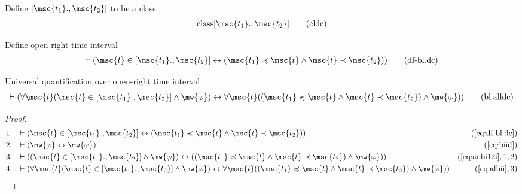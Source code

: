 \begin{metadefinition} Define $[ \msc{t_1}  .,  \msc{t_2} ]$ to be
a class
\begin{align}
{\rm class} [ \msc{t_1} ., \msc{t_2} ]\label{eq:cldc}\tag{cldc}
\end{align}
\end{metadefinition}

\begin{metadefinition} Define open-right time interval
\begin{align}
\vdash ( \msc{t} \in [ \msc{t_1} ., \msc{t_2} ] \leftrightarrow ( \msc{t_1}
    \preccurlyeq \msc{t} \wedge \msc{t} \prec \msc{t_2} )
    )\label{eq:df-bl.dc}\tag{df-bl.dc}
\end{align}
\end{metadefinition}

\begin{lemma} Universal quantification over open-right
time interval
\begin{align}
\vdash ( \forall \msc{t} ( \msc{t} \in [ \msc{t_1} ., \msc{t_2} ] \wedge
    \mw{\varphi} ) \leftrightarrow \forall \msc{t} ( ( \msc{t_1} \preccurlyeq
    \msc{t} \wedge \msc{t} \prec \msc{t_2} ) \wedge \mw{\varphi} )
    )\label{eq:bl.alldc}\tag{bl.alldc}
\end{align}
\end{lemma}

\begin{proof}
\begin{align}
  1 &&  & \vdash ( \msc{t} \in [ \msc{t_1} ., \msc{t_2} ] \leftrightarrow ( \msc{t_1} \preccurlyeq \msc{t} \wedge \msc{t} \prec \msc{t_2} ) )&(\mbox{\ref{eq:df-bl.dc}})\notag
  \\ 2 &&  & \vdash ( \mw{\varphi} \leftrightarrow \mw{\varphi} )&(\mbox{\ref{eq:biid}})\notag
  \\ 3 &&  & \vdash ( ( \msc{t} \in [ \msc{t_1} ., \msc{t_2} ] \wedge \mw{\varphi} ) \leftrightarrow ( ( \msc{t_1} \preccurlyeq \msc{t} \wedge \msc{t} \prec \msc{t_2} ) \wedge \mw{\varphi} ) )&(\mbox{\ref{eq:anbi12i}},1,2)\notag
  \\ 4 &&  & \vdash ( \forall \msc{t} ( \msc{t} \in [ \msc{t_1} ., \msc{t_2} ] \wedge \mw{\varphi} ) \leftrightarrow \forall \msc{t} ( ( \msc{t_1} \preccurlyeq \msc{t} \wedge \msc{t} \prec \msc{t_2} ) \wedge \mw{\varphi} ) )&(\mbox{\ref{eq:albii}},3)\notag
\end{align}
\end{proof}

